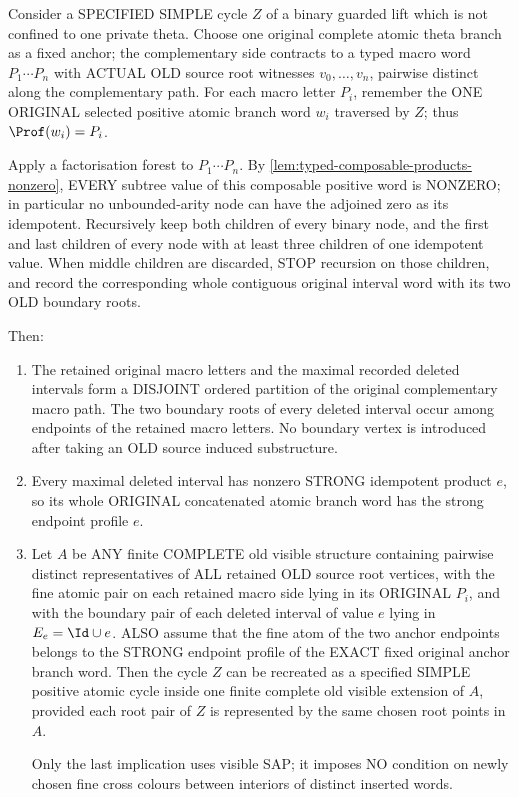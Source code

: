 \begin{lemma}
\label{lem:typed-pruned-cycle-reconstruction}
Consider a SPECIFIED SIMPLE cycle
\(Z\) of a binary guarded lift which
is not confined to one private theta.
Choose one original complete atomic
theta branch as a fixed anchor;
the complementary side contracts to
a typed macro word
\(P_1\cdots P_n\) with ACTUAL OLD
source root witnesses
\(v_0,\ldots,v_n\), pairwise distinct
along the complementary path.
For each macro letter \(P_i\),
remember the ONE ORIGINAL selected
positive atomic branch word \(w_i\)
traversed by \(Z\); thus
\(\Prof(w_i)=P_i\).

Apply a factorisation forest to
\(P_1\cdots P_n\).
By
\cref{lem:typed-composable-products-nonzero},
EVERY subtree value of this
composable positive word
is NONZERO; in particular
no unbounded-arity node
can have the adjoined
zero as its idempotent.
Recursively keep
both children of every binary node,
and the first and last children of
every node with at least three
children of one idempotent value.
When middle children are discarded,
STOP recursion on those children,
and record the corresponding whole
contiguous original interval word
with its two OLD boundary roots.

Then:
\begin{enumerate}[label=(\roman*)]
\item The retained original macro
letters and the maximal recorded
deleted intervals form a DISJOINT
ordered partition of the original
complementary macro path. The two
boundary roots of every deleted
interval occur among endpoints of
the retained macro letters. No
boundary vertex is introduced
after taking an OLD source induced
substructure.
\item Every maximal deleted
interval has nonzero STRONG
idempotent product \(e\), so its
whole ORIGINAL concatenated
atomic branch word has the
strong endpoint profile \(e\).
\item Let \(A\) be ANY finite
COMPLETE old visible structure
containing pairwise distinct
representatives of ALL retained
OLD source root vertices, with
the fine atomic pair on each
retained macro side lying in its
ORIGINAL \(P_i\), and with the
boundary pair of each deleted
interval of value \(e\) lying in
\(E_e=\Id\cup e\).
ALSO assume that the fine atom
of the two anchor endpoints
belongs to the STRONG endpoint
profile of the EXACT fixed
original anchor branch word.
Then the cycle \(Z\) can be
recreated as a specified
SIMPLE positive atomic cycle
inside one finite complete old
visible extension of \(A\),
provided each root pair of \(Z\)
is represented by the same
chosen root points in \(A\).

Only the last implication uses
visible SAP; it imposes NO
condition on newly chosen fine
cross colours between interiors
of distinct inserted words.
\end{enumerate}
\end{lemma}
